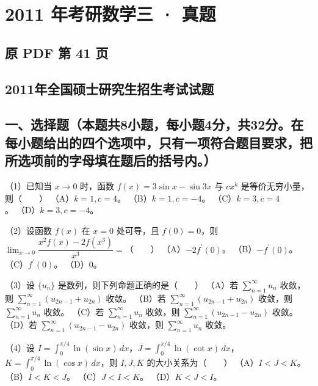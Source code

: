 \documentclass[UTF8,12pt]{ctexart}
\begin{document}
\section*{2011 年考研数学三 · 真题}
\subsection*{原 PDF 第 41 页}

\subsection*{2011年全国硕士研究生招生考试试题}

\subsection*{一、选择题（本题共8小题，每小题4分，共32分。在每小题给出的四个选项中，只有一项符合题目要求，把所选项前的字母填在题后的括号内。）}

（1）已知当 \(\displaystyle x\to0\) 时，函数 \(\displaystyle f(x)=3\sin x-\sin 3x\) 与 \(\displaystyle cx^k\) 是等价无穷小量，则（　　）
（A）\(\displaystyle k=1,\allowbreak c=4\)。 （B）\(\displaystyle k=1,\allowbreak c=-4\)。 （C）\(\displaystyle k=3,\allowbreak c=4\)。 （D）\(\displaystyle k=3,\allowbreak c=-4\)。


（2）设函数 \(\displaystyle f(x)\) 在 \(\displaystyle x=0\) 处可导，且 \(\displaystyle f(0)=0\)，则 \(\displaystyle \lim_{x\to0}\dfrac{\displaystyle x^2f(x)-2f(x^3)}{\displaystyle x^3}=\)（　　）
（A）\(\displaystyle -2f^{\prime}(0)\)。 （B）\(\displaystyle -f^{\prime}(0)\)。 （C）\(\displaystyle f^{\prime}(0)\)。 （D）\(\displaystyle 0\)。


（3）设 \(\displaystyle \{u_n\}\) 是数列，则下列命题正确的是（　　）
（A）若 \(\displaystyle \sum_{n=1}^{\infty}u_n\) 收敛，则 \(\displaystyle \sum_{n=1}^{\infty}(u_{2n-1}+u_{2n})\) 收敛。
（B）若 \(\displaystyle \sum_{n=1}^{\infty}(u_{2n-1}+u_{2n})\) 收敛，则 \(\displaystyle \sum_{n=1}^{\infty}u_n\) 收敛。
（C）若 \(\displaystyle \sum_{n=1}^{\infty}u_n\) 收敛，则 \(\displaystyle \sum_{n=1}^{\infty}(u_{2n-1}-u_{2n})\) 收敛。
（D）若 \(\displaystyle \sum_{n=1}^{\infty}(u_{2n-1}-u_{2n})\) 收敛，则 \(\displaystyle \sum_{n=1}^{\infty}u_n\) 收敛。


（4）设 \(\displaystyle I=\displaystyle \int_0^{\pi/4}\ln(\sin x)\,dx\)，\(\displaystyle J=\displaystyle \int_0^{\pi/4}\ln(\cot x)\,dx\)，\(\displaystyle K=\displaystyle \int_0^{\pi/4}\ln(\cos x)\,dx\)，则 \(\displaystyle I,\allowbreak J,\allowbreak K\) 的大小关系为（　　）
（A）\(\displaystyle I<J<K\)。 （B）\(\displaystyle I<K<J\)。 （C）\(\displaystyle J<I<K\)。 （D）\(\displaystyle K<J<I\)。
\end{document}
